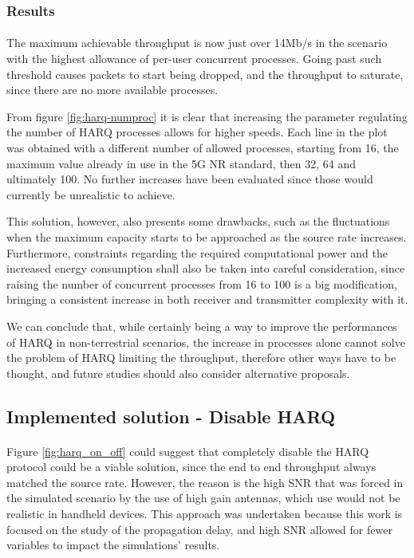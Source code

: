 \subsubsection{Results}
\paragraph{}
The maximum achievable throughput is now just over 14Mb/s in the scenario with the highest allowance of per-user concurrent processes. Going past such threshold causes packets to start being dropped, and the throughput to saturate, since there are no more available processes.

From figure \ref{fig:harq-numproc} it is clear that increasing the parameter regulating the number of \ac{HARQ} processes allows for higher speeds. Each line in the plot was obtained with a different number of allowed processes, starting from 16, the maximum value already in use in the 5G \ac{NR} standard, then 32, 64 and ultimately 100. No further increases have been evaluated since those would currently be unrealistic to achieve.

This solution, however, also presents some drawbacks, such as the fluctuations when the maximum capacity starts to be approached as the source rate increases. Furthermore, constraints regarding the required computational power and the increased energy consumption shall also be taken into careful consideration, since raising the number of concurrent processes from 16 to 100 is a big modification, bringing a consistent increase in both receiver and transmitter complexity with it.

We can conclude that, while certainly being a way to improve the performances of \ac{HARQ} in non-terrestrial scenarios, the increase in processes alone cannot solve the problem of \ac{HARQ} limiting the throughput, therefore other ways have to be thought, and future studies should also consider alternative proposals.

\subsection{Implemented solution - Disable HARQ}
\paragraph{}
Figure \ref{fig:harq_on_off} could suggest that completely disable the \ac{HARQ} protocol could be a viable solution, since the end to end throughput always matched the source rate. However, the reason is the high \ac{SNR} that was forced in the simulated scenario by the use of high gain antennas, which use would not be realistic in handheld devices. This approach was undertaken because this work is focused on the study of the propagation delay, and high \ac{SNR} allowed for fewer variables to impact the simulations' results.

